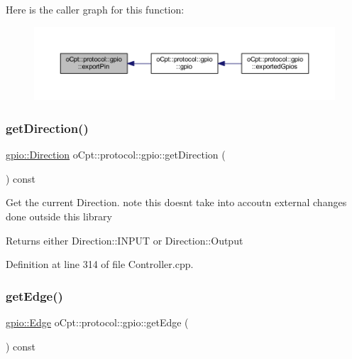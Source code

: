 Here is the caller graph for this function\+:\nopagebreak
\begin{figure}[H]
\begin{center}
\leavevmode
\includegraphics[width=350pt]{classo_cpt_1_1protocol_1_1gpio_af7fef4210406ea75eb04cc96fd99e7eb_icgraph}
\end{center}
\end{figure}
\hypertarget{classo_cpt_1_1protocol_1_1gpio_aa89066f15bd97035908e7df75913c54b}{}\label{classo_cpt_1_1protocol_1_1gpio_aa89066f15bd97035908e7df75913c54b} 
\subsubsection{\texorpdfstring{get\+Direction()}{getDirection()}}
{\footnotesize\ttfamily \hyperlink{classo_cpt_1_1protocol_1_1gpio_af7acf963933bbc47d11d6fa1b8ce4d5b}{gpio\+::\+Direction} o\+Cpt\+::protocol\+::gpio\+::get\+Direction (\begin{DoxyParamCaption}{ }\end{DoxyParamCaption}) const}

Get the current Direction. note this doesn\textquotesingle{}t take into accoutn external changes done outside this library \begin{DoxyReturn}{Returns}
either Direction\+::\+I\+N\+P\+UT or Direction\+::\+Output 
\end{DoxyReturn}


Definition at line 314 of file Controller.\+cpp.

\hypertarget{classo_cpt_1_1protocol_1_1gpio_a1eaae952cf8f11f4d62989dace78607e}{}\label{classo_cpt_1_1protocol_1_1gpio_a1eaae952cf8f11f4d62989dace78607e} 
\subsubsection{\texorpdfstring{get\+Edge()}{getEdge()}}
{\footnotesize\ttfamily \hyperlink{classo_cpt_1_1protocol_1_1gpio_adbbd34b2bc4394ad5a71d94641dda9f9}{gpio\+::\+Edge} o\+Cpt\+::protocol\+::gpio\+::get\+Edge (\begin{DoxyParamCaption}{ }\end{DoxyParamCaption}) const}

